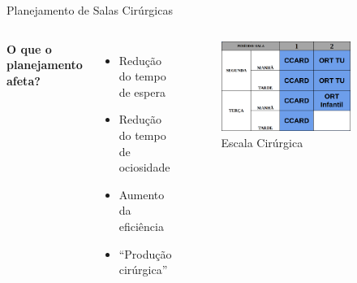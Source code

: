 \documentclass[10pt]{beamer}
\begin{document}
\begin{frame}{Planejamento de Salas Cirúrgicas}
    \begin{columns}[t]
        \textbf{O que o planejamento afeta?}
        \begin{itemize}
            \setlength\itemsep{1em}
            \item Redução do tempo de espera
            \item Redução do tempo de ociosidade
            \item Aumento da eficiência
            \item ``Produção cirúrgica''
        \end{itemize}
        \begin{figure}
            \setcounter{figure}{\the\numexpr\value{figure}-1\relax}
            \centering
            \includegraphics[width=0.8\textwidth]{images/schedule.png}
            \caption{Escala Cirúrgica\label{fig:schedule}}
            \setcounter{figure}{\the\numexpr\value{figure}+1\relax}
        \end{figure}
    \end{columns}
\end{frame}
\end{document}
